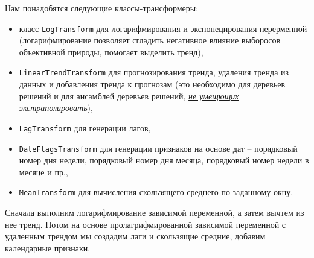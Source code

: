 \documentclass[%
	11pt,
	a4paper,
	utf8,
		]{article}
\begin{document}
Нам понадобятся следующие классы-трансформеры:
\begin{itemize}
	\item класс \texttt{LogTransform} для логарифмирования и экспонецирования перерменной (логарифмирование позволяет сгладить негативное влияние выборосов объективной природы, помогает выделить тренд),
	
	\item \texttt{LinearTrendTransform} для прогнозирования тренда, удаления тренда из данных и добавления тренда к прогнозам (это необходимо для деревьев решений и для ансамблей деревьев решений, \underline{\emph{не умещющих экстраполировать}}),
	
	\item \texttt{LagTransform} для генерации лагов,
	
	\item \texttt{DateFlagsTransform} для генерации признаков на основе дат -- порядковый номер дня недели, порядковый номер дня месяца, порядковый номер недели в месяце и пр.,
	
	\item \texttt{MeanTransform} для вычисления скользящего среднего по заданному окну.
\end{itemize}

Сначала выполним логарифмирование зависимой переменной, а затем вычтем из нее тренд. Потом на основе пролагрифмированной зависимой переменной с удаленным трендом мы создадим лаги и скользящие средние, добавим календарные признаки.
\end{document}
